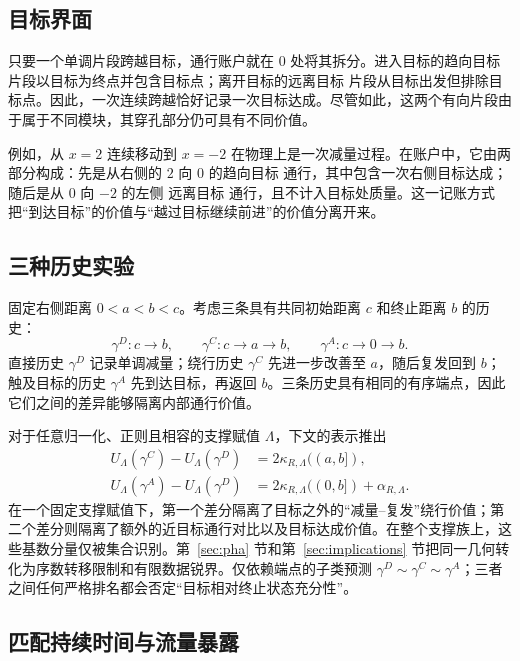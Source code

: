 \subsection{目标界面}

只要一个单调片段跨越目标，通行账户就在 $0$ 处将其拆分。进入目标的趋向目标 片段以目标为终点并包含目标点；离开目标的远离目标 片段从目标出发但排除目标点。因此，一次连续跨越恰好记录一次目标达成。尽管如此，这两个有向片段由于属于不同模块，其穿孔部分仍可具有不同价值。

例如，从 $x=2$ 连续移动到 $x=-2$ 在物理上是一次减量过程。在账户中，它由两部分构成：先是从右侧的 $2$ 向 $0$ 的趋向目标 通行，其中包含一次右侧目标达成；随后是从 $0$ 向 $-2$ 的左侧 远离目标 通行，且不计入目标处质量。这一记账方式把“到达目标”的价值与“越过目标继续前进”的价值分离开来。

\subsection{三种历史实验}

固定右侧距离 $0<a<b<c$。考虑三条具有共同初始距离 $c$ 和终止距离 $b$ 的历史：
\[
 \gamma^D:c\longrightarrow b,
 \qquad
 \gamma^C:c\longrightarrow a\longrightarrow b,
 \qquad
 \gamma^A:c\longrightarrow0\longrightarrow b.
\]
直接历史 $\gamma^D$ 记录单调减量；绕行历史 $\gamma^C$ 先进一步改善至 $a$，随后复发回到 $b$；触及目标的历史 $\gamma^A$ 先到达目标，再返回 $b$。三条历史具有相同的有序端点，因此它们之间的差异能够隔离内部通行价值。

对于任意归一化、正则且相容的支撑赋值 $\Lambda$，下文的表示推出
\[
\begin{aligned}
 U_\Lambda(\gamma^C)-U_\Lambda(\gamma^D)
  &=2\kappa_{R,\Lambda}((a,b]),\\
 U_\Lambda(\gamma^A)-U_\Lambda(\gamma^D)
  &=2\kappa_{R,\Lambda}((0,b])+\alpha_{R,\Lambda}.
\end{aligned}
\]
在一个固定支撑赋值下，第一个差分隔离了目标之外的“减量--复发”绕行价值；第二个差分则隔离了额外的近目标通行对比以及目标达成价值。在整个支撑族上，这些基数分量仅被集合识别。第~\ref{sec:pha} 节和第~\ref{sec:implications} 节把同一几何转化为序数转移限制和有限数据锐界。仅依赖端点的子类预测 $\gamma^D\sim\gamma^C\sim\gamma^A$；三者之间任何严格排名都会否定“目标相对终止状态充分性”。

\subsection{匹配持续时间与流量暴露}\label{sec:matched}

